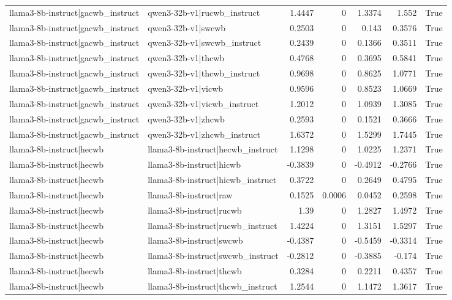 \begin{table}
\begin{tabular}{l l r r r r l}
llama3-8b-instruct|gacwb_instruct & qwen3-32b-v1|rucwb_instruct & 1.4447 & 0 & 1.3374 & 1.552 & True \\
llama3-8b-instruct|gacwb_instruct & qwen3-32b-v1|swcwb & 0.2503 & 0 & 0.143 & 0.3576 & True \\
llama3-8b-instruct|gacwb_instruct & qwen3-32b-v1|swcwb_instruct & 0.2439 & 0 & 0.1366 & 0.3511 & True \\
llama3-8b-instruct|gacwb_instruct & qwen3-32b-v1|thcwb & 0.4768 & 0 & 0.3695 & 0.5841 & True \\
llama3-8b-instruct|gacwb_instruct & qwen3-32b-v1|thcwb_instruct & 0.9698 & 0 & 0.8625 & 1.0771 & True \\
llama3-8b-instruct|gacwb_instruct & qwen3-32b-v1|vicwb & 0.9596 & 0 & 0.8523 & 1.0669 & True \\
llama3-8b-instruct|gacwb_instruct & qwen3-32b-v1|vicwb_instruct & 1.2012 & 0 & 1.0939 & 1.3085 & True \\
llama3-8b-instruct|gacwb_instruct & qwen3-32b-v1|zhcwb & 0.2593 & 0 & 0.1521 & 0.3666 & True \\
llama3-8b-instruct|gacwb_instruct & qwen3-32b-v1|zhcwb_instruct & 1.6372 & 0 & 1.5299 & 1.7445 & True \\
llama3-8b-instruct|hecwb & llama3-8b-instruct|hecwb_instruct & 1.1298 & 0 & 1.0225 & 1.2371 & True \\
llama3-8b-instruct|hecwb & llama3-8b-instruct|hicwb & -0.3839 & 0 & -0.4912 & -0.2766 & True \\
llama3-8b-instruct|hecwb & llama3-8b-instruct|hicwb_instruct & 0.3722 & 0 & 0.2649 & 0.4795 & True \\
llama3-8b-instruct|hecwb & llama3-8b-instruct|raw & 0.1525 & 0.0006 & 0.0452 & 0.2598 & True \\
llama3-8b-instruct|hecwb & llama3-8b-instruct|rucwb & 1.39 & 0 & 1.2827 & 1.4972 & True \\
llama3-8b-instruct|hecwb & llama3-8b-instruct|rucwb_instruct & 1.4224 & 0 & 1.3151 & 1.5297 & True \\
llama3-8b-instruct|hecwb & llama3-8b-instruct|swcwb & -0.4387 & 0 & -0.5459 & -0.3314 & True \\
llama3-8b-instruct|hecwb & llama3-8b-instruct|swcwb_instruct & -0.2812 & 0 & -0.3885 & -0.174 & True \\
llama3-8b-instruct|hecwb & llama3-8b-instruct|thcwb & 0.3284 & 0 & 0.2211 & 0.4357 & True \\
llama3-8b-instruct|hecwb & llama3-8b-instruct|thcwb_instruct & 1.2544 & 0 & 1.1472 & 1.3617 & True \\

\end{tabular}
\end{table}
